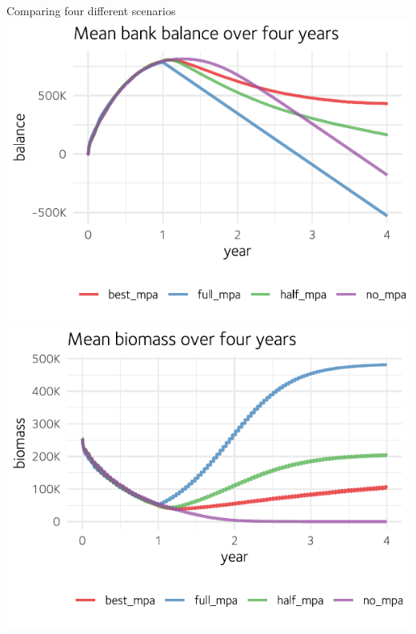 \documentclass[table, 14pt, aspectratio=169]{beamer}
\begin{document}
\begin{frame}{Comparing four different scenarios}
  \includegraphics[width=0.49\linewidth]{images/experiment_balance.pdf}
  \hfill
  \includegraphics[width=0.49\linewidth]{images/experiment_biomass.pdf}
\end{frame}
\end{document}

